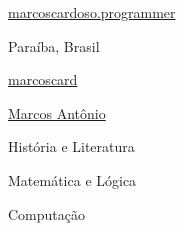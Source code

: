 \documentclass[11pt]{spidercv}
\begin{document}
\begin{TopBar}{\ColorTextSide}

    \begin{DoubleColumns}
        \begin{ItemList}{\ColorHighlight}
            \item [\Large\faAt] \href{mailto:marcoscardoso.programmer@gmail.com}{marcoscardoso.programmer}
            \item [\Large\faMapMarker] Paraíba, Brasil
        \end{ItemList}
        \nextcolumn
        \begin{ItemList}{\ColorHighlight}
            \item [\Large\faGithub] \href{https://github.com/marcoscard}{marcoscard}
            \item [\Large\faLinkedinSquare] \href{https://www.linkedin.com/in/marcos-ant%C3%B4nio-cardoso-pereira-2b44611b3/}{Marcos Antônio}
        \end{ItemList}
    \end{DoubleColumns}

    \begin{TripleColumns}
        \begin{ItemList}{\ColorHighlight}
            \item [] História e Literatura
        \end{ItemList}
        \nextcolumn
        \begin{ItemList}{\ColorHighlight}
            \item [] Matemática e Lógica
        \end{ItemList}
        \nextcolumn
        \begin{ItemList}{\ColorHighlight}
            \item [] Computação
        \end{ItemList}
    \end{TripleColumns}
\end{TopBar}
\end{document}
